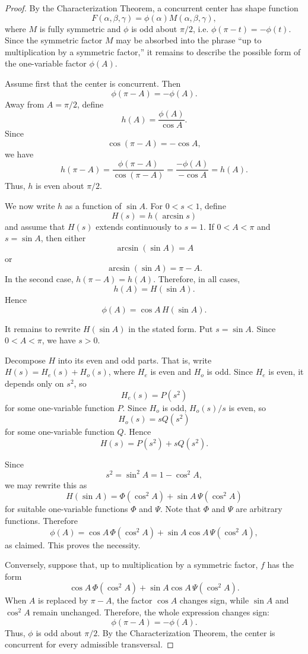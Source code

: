\documentclass[12pt,a4paper]{amsart}
\theoremstyle{remark}
\begin{document}
\begin{proof}
By the Characterization Theorem, a concurrent center has shape function
\[
F(\alpha,\beta,\gamma)=\phi(\alpha)M(\alpha,\beta,\gamma),
\]
where \(M\) is fully symmetric and \(\phi\) is odd about \(\pi/2\), i.e. $\phi(\pi-t)=-\phi(t)$.  Since the
symmetric factor \(M\) may be absorbed into the phrase ``up to multiplication by
a symmetric factor,'' it remains to describe the possible form of the one-variable
factor \(\phi(A)\).

Assume first that the center is concurrent.  Then
\[
\phi(\pi-A)=-\phi(A).
\]
Away from \(A=\pi/2\), define
\[
h(A)=\frac{\phi(A)}{\cos A}.
\]
Since
\[
\cos(\pi-A)=-\cos A,
\]
we have
\[
h(\pi-A)
=
\frac{\phi(\pi-A)}{\cos(\pi-A)}
=
\frac{-\phi(A)}{-\cos A}
=
h(A).
\]
Thus, \(h\) is even about \(\pi/2\).

We now write \(h\) as a function of \(\sin A\).  For \(0<s<1\), define
\[
H(s)=h(\arcsin s)
\]
and assume that $H(s)$ extends continuously to $s=1$.
If \(0<A<\pi\) and \(s=\sin A\), then either
\[
\arcsin(\sin A)=A
\]
or
\[
\arcsin(\sin A)=\pi-A.
\]
In the second case, \(h(\pi-A)=h(A)\).  Therefore, in all cases,
\[
h(A)=H(\sin A).
\]
Hence
\[
\phi(A)=\cos A\,H(\sin A).
\]

It remains to rewrite \(H(\sin A)\) in the stated form. Put $s=\sin A$.
Since \(0<A<\pi\), we have \(s>0\).


Decompose $H$ into its even and odd parts.
That is, write
$H(s)=H_e(s)+H_o(s)$,
where
$H_e$ is even and $H_o$ is odd.
Since \(H_e\) is even, it depends only
on \(s^2\), so
\[
H_e(s)=P(s^2)
\]
for some one-variable function \(P\).  Since \(H_o\) is odd, \(H_o(s)/s\) is even,
so
\[
H_o(s)=sQ(s^2)
\]
for some one-variable function \(Q\).  Hence
\[
H(s)=P(s^2)+sQ(s^2).
\]

Since
\[
s^2=\sin^2 A=1-\cos^2 A,
\]
we may rewrite this as
\[
H(\sin A)
=
\Phi(\cos^2 A)+\sin A\,\Psi(\cos^2 A)
\]
for suitable one-variable functions \(\Phi\) and \(\Psi\).
Note that \(\Phi\) and \(\Psi\) are arbitrary functions.
Therefore
\[
\phi(A)
=
\cos A\,\Phi(\cos^2 A)
+
\sin A\cos A\,\Psi(\cos^2 A),
\]
as claimed.
This proves the necessity.

Conversely, suppose that, up to multiplication by a symmetric factor, $f$ has the form
\[
\cos A\,\Phi(\cos^2 A)
+
\sin A\cos A\,\Psi(\cos^2 A).
\]
When \(A\) is replaced by \(\pi-A\), the factor \(\cos A\) changes sign, while
\(\sin A\) and \(\cos^2 A\) remain unchanged.  Therefore, the whole expression
changes sign:
\[
\phi(\pi-A)=-\phi(A).
\]
Thus, \(\phi\) is odd about \(\pi/2\).  By the Characterization Theorem, the center
is concurrent for every admissible transversal.
\end{proof}
\end{document}
